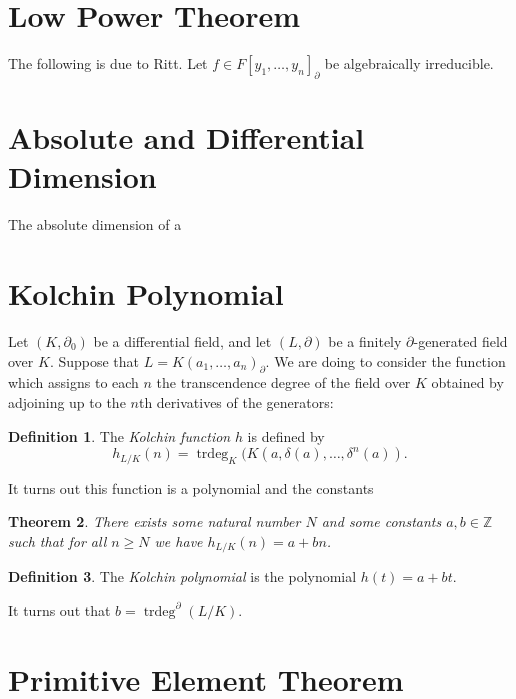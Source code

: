 \documentclass[]{article}
\numberwithin{equation}{section}
\newtheorem{theorem}{Theorem}[subsection]
\theoremstyle{definition}
\newtheorem{definition}[theorem]{Definition}
\theoremstyle{remark}
\newcommand{\trdeg}{\operatorname{trdeg}}
\newcommand{\ZZ}{\mathbb{Z}}
\begin{document}
\section{Low Power Theorem}

The following is due to Ritt. 
Let $f \in F[y_1,\ldots,y_n]_{\partial}$ be algebraically irreducible. 



\section{Absolute and Differential Dimension}

The absolute dimension of a 

\section{Kolchin Polynomial}

Let $(K,\partial_0)$ be a differential field, and let $(L,\partial)$ be a finitely $\partial$-generated field over $K$. 
Suppose that $L = K(a_1,\ldots,a_n)_{\partial}$. 
We are doing to consider the function which assigns to each $n$ the transcendence degree of the field over $K$ obtained by adjoining up to the $n$th derivatives of the generators:
\begin{definition}
The \emph{Kolchin function} $h$ is defined by 
 $$ h_{L/K}(n) = \trdeg_K( K(a,\delta(a), \ldots, \delta^n(a) ). $$
\end{definition}
It turns out this function is a polynomial and the constants 

\begin{theorem}
	There exists some natural number $N$ and some constants $a,b\in \ZZ$ such that for all $n\geq N$ we have $h_{L/K}(n) = a+bn$. 
\end{theorem}

\begin{definition}
	The \emph{Kolchin polynomial} is the polynomial $h(t) = a+bt$. 
\end{definition}

It turns out that $b=\trdeg^{\partial}(L/K)$.

\section{Primitive Element Theorem}\label{sec:primitive}
\end{document}
